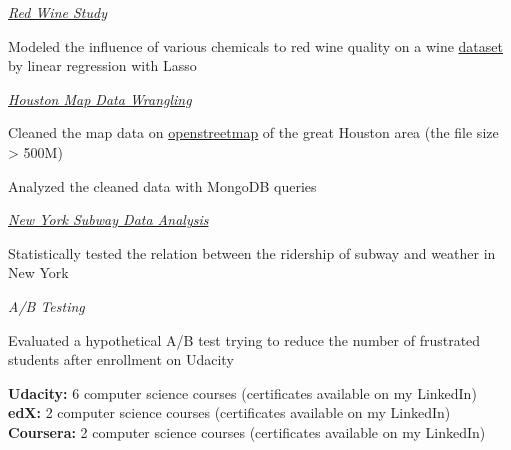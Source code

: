 \documentclass[12pt,letterpaper]{article}
\newenvironment{itemize*}%
{\begin{itemize}%
  \setlength{\itemsep}{0pt}}%
{\end{itemize}}
\newcommand{\mhead}[1]{\leavevmode\marginpar{\sffamily\footnotesize #1}}
\begin{document}
\smallskip
\href{https://github.com/tcya/what-affects-red-wine-quality}{\emph{Red Wine Study}}
\begin{itemize*}
  \item Modeled the influence of various chemicals to red wine quality on a wine \href{https://s3.amazonaws.com/udacity-hosted-downloads/ud651/wineQualityInfo.txt}{dataset} by linear regression with Lasso
\end{itemize*}

\smallskip
\href{https://github.com/tcya/houston-mapdata-wrangling}{\emph{Houston Map Data Wrangling}}
\begin{itemize*}
  \item Cleaned the map data on \href{www.openstreetmap.org}{openstreetmap} of the great Houston area (the file size > 500M)
  \item Analyzed the cleaned data with MongoDB queries
\end{itemize*}

\smallskip
\href{https://github.com/tcya/new-york-subway-data-analysis}{\emph{New York Subway Data Analysis}}
\begin{itemize*}
  \item Statistically tested the relation between the ridership of subway and weather in New York
\end{itemize*}

\smallskip
\emph{A/B Testing}
\begin{itemize*}
  \item Evaluated a hypothetical A/B test trying to reduce the number of frustrated students after enrollment on Udacity
\end{itemize*}

\bigskip
\mhead{Independent \newline Coursework}%
\textbf{Udacity:} 6 computer science courses (certificates available on my LinkedIn) \\
\textbf{edX:} 2 computer science courses (certificates available on my LinkedIn)\\
\textbf{Coursera:} 2 computer science courses (certificates available on my LinkedIn)

\bigskip
\end{document}
